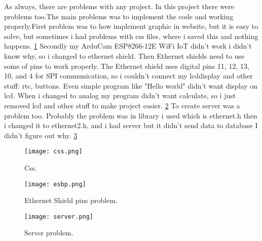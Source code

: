 As always, there are problems with any project. In this project there were problems too.\newline The main problems was to implement the code and working properly.\newline First problem was to how implement graphic in website, but it is easy to solve, but sometimes i had problems with css files, where i saved this and nothing happens. \ref{fig:Css} \newline \newline
Secondly my ArduCam ESP8266-12E WiFi IoT didn't work i didn't know why, so i changed to ethernet shield. Then Ethernet shields need to use some of pins to work properly. The Ethernet shield uses digital pins 11, 12, 13, 10, and 4 for SPI communication, so i couldn't connect my lcddisplay and other stuff: rtc, buttons. Even simple program like "Hello world" didn't want display on lcd. When i changed to analog my program didn't want calculate, so i just removed lcd and other stuff to make project easier. \ref{fig:Esbp} \newline \newline \newline
To create server was a problem too. Probably the problem was in library i used which is ethernet.h then i changed it to ethernet2.h, and i had server but it didn't send data to database I didn't figure out why. \ref{fig:Server}\newline \newline
\begin{figure}[!b]
	\centering
	\texttt{[image: css.png]}
	\caption{Css.\label{fig:Css}}
\end{figure}

\begin{figure}[!b]
	\centering
	\texttt{[image: esbp.png]}
	\caption{Ethernet Shield pins problem.\label{fig:Esbp}}
\end{figure}

\begin{figure}[!b]
	\centering
	\texttt{[image: server.png]}
	\caption{Server problem.\label{fig:Server}}
\end{figure}